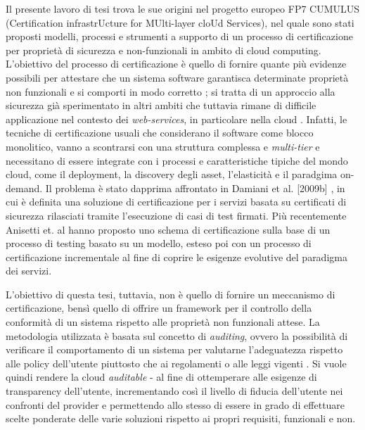 \documentclass[../main.tex]{subfiles}
\begin{document}
Il presente lavoro di tesi trova le sue origini nel progetto europeo FP7 CUMULUS \cite{CumulusBigDoc} (Certification infrastrUcture for MUlti-layer cloUd Services), nel quale sono stati proposti modelli, processi e strumenti a supporto di un processo di certificazione per proprietà di sicurezza e non-funzionali in ambito di cloud computing.
L'obiettivo del processo di certificazione è quello di fornire quante più evidenze possibili per attestare che un sistema software garantisca determinate proprietà non funzionali e si comporti in modo corretto \cite{Ardagna:2015:SAC:2808687.2767005}; si tratta di un approccio alla sicurezza già sperimentato in altri ambiti che tuttavia rimane di difficile applicazione nel contesto dei \textit{web-services}, in particolare nella cloud \cite{Anisetti:2013:TSC:2460383.2460384}.
Infatti, le tecniche di certificazione usuali che considerano il software come blocco monolitico, vanno a scontrarsi con una struttura complessa e \textit{multi-tier} \cite{Anisetti:2013:TSC:2460383.2460384}
e necessitano di essere integrate con i processi e caratteristiche tipiche del mondo cloud, come il deployment, la discovery degli asset, l'elasticità e il paradgima on-demand.
Il problema è stato dapprima affrontato in Damiani et al. [2009b] \cite{5190685}, in cui è definita una soluzione di certificazione per i servizi basata su certificati di sicurezza rilasciati tramite l'esecuzione di casi di test firmati.
Più recentemente Anisetti et. al \cite{CertEvolutiva} \cite{CertSoa} \cite{6649614} hanno proposto uno schema di certificazione sulla base di un processo di testing basato su un modello, esteso poi con un processo di certificazione incrementale al fine di coprire le esigenze evolutive del paradigma dei servizi.

L'obiettivo di questa tesi, tuttavia, non è quello di fornire un meccanismo di certificazione, bensì quello di offrire un framework per il controllo della conformità di un sistema rispetto alle proprietà non funzionali attese.
La metodologia utilizzata è basata sul concetto di \textit{auditing}, ovvero la possibilità  di verificare il comportamento di un sistema per valutarne l'adeguatezza rispetto alle policy dell'utente piuttosto che ai regolamenti o alle leggi vigenti \cite{Ardagna:2015:SAC:2808687.2767005}.
Si vuole quindi rendere la cloud \textit{auditable} - al fine di ottemperare alle esigenze di transparency dell'utente, incrementando così il livello di fiducia dell'utente nei confronti del provider e permettendo allo stesso di essere in grado di effettuare scelte ponderate delle varie soluzioni rispetto ai propri requisiti, funzionali e non.
\end{document}

